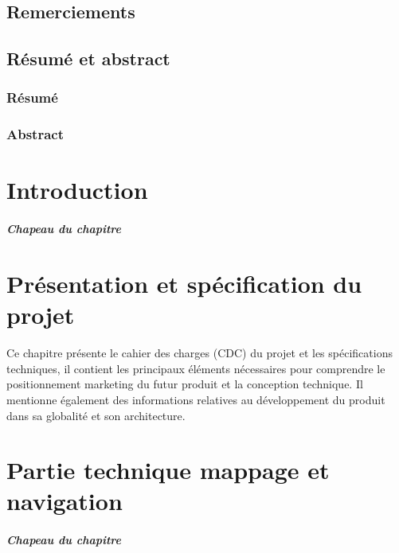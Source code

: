 \documentclass[12pt, french]{report}
\begin{document}

\clearpage

\thispagestyle{empty}
\section*{Remerciements}

\clearpage
\thispagestyle{empty}
\section*{Résumé et abstract}
\subsection*{Résumé}

\subsection*{Abstract}

\clearpage
\setcounter{page}{1}
\tableofcontents
\listoffigures

\clearpage

\chapter{Introduction}
\paragraph{Chapeau du chapitre}

\clearpage

\chapter{Présentation et spécification du projet}
Ce chapitre présente le cahier des charges (CDC) du projet et les
spécifications techniques, il contient les principaux éléments nécessaires
pour comprendre le positionnement marketing du futur produit et la
conception technique. Il mentionne également des informations relatives au
développement du produit dans sa globalité et son architecture.


\clearpage

\chapter{Partie technique mappage et navigation}
\paragraph{Chapeau du chapitre}

\clearpage
\end{document}
